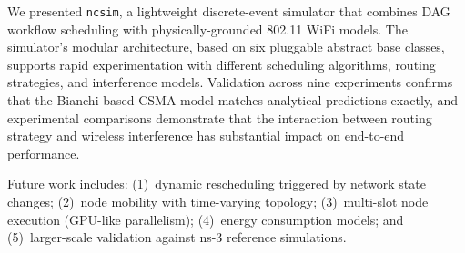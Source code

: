 \documentclass[conference]{IEEEtran}
\newcommand{\ncsim}{\texttt{ncsim}}
\begin{document}
We presented \ncsim{}, a lightweight discrete-event simulator that combines
DAG workflow scheduling with physically-grounded 802.11 WiFi models.  The
simulator's modular architecture, based on six pluggable abstract base
classes, supports rapid experimentation with different scheduling algorithms,
routing strategies, and interference models.  Validation across nine
experiments confirms that the Bianchi-based CSMA model matches analytical
predictions exactly, and experimental comparisons demonstrate that the
interaction between routing strategy and wireless interference has substantial
impact on end-to-end performance.

Future work includes: (1)~dynamic rescheduling triggered by network state
changes; (2)~node mobility with time-varying topology; (3)~multi-slot node
execution (GPU-like parallelism); (4)~energy consumption models; and
(5)~larger-scale validation against ns-3 reference simulations.
\end{document}
